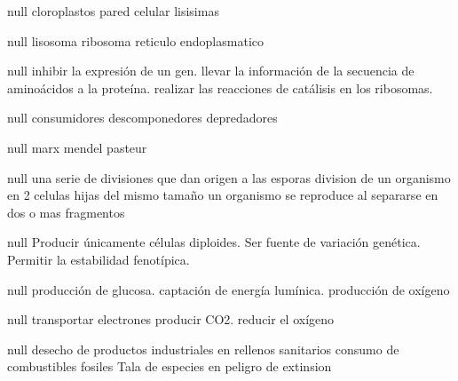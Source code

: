 \documentclass[10pt,a4paper]{article}
\begin{document}
\begin{multicols*}{2}
			{null}
				{cloroplastos}
				{pared celular}
				{lisisimas}
				
			{null}
				{lisosoma}
				{ribosoma}
				{reticulo endoplasmatico}
				
				
			{null}
				{inhibir la expresión de un gen.}
				{llevar la información de la secuencia
de aminoácidos a la proteína.}
				{realizar las reacciones de catálisis en
los ribosomas.}
				
				
			{null}
				{consumidores}
				{descomponedores}
				{depredadores}
				
			{null}
				{marx}
				{mendel}
				{pasteur}
				
			{null}
				{una serie de divisiones que dan origen a las esporas}
				{division de un organismo en 2 celulas hijas del mismo tamaño}
				{un organismo se reproduce al separarse en dos o mas fragmentos}
				
			{null}
				{Producir únicamente células
diploides.}
				{Ser fuente de variación genética.}
				{Permitir la estabilidad fenotípica.}
				
			{null}
				{producción de glucosa.}
				{captación de energía lumínica.}
				{producción de oxígeno}
				
				
			{null}
				{transportar electrones}
				{producir CO2.}
				{reducir el oxígeno}
				
			{null}
				{desecho de productos industriales en rellenos sanitarios}
				{consumo de combustibles fosiles}
				{Tala de especies en peligro de extinsion}
				
				
				
				
				
				
				
				
				



				
				
					
	
	\end{multicols*}
	
\end{document}
